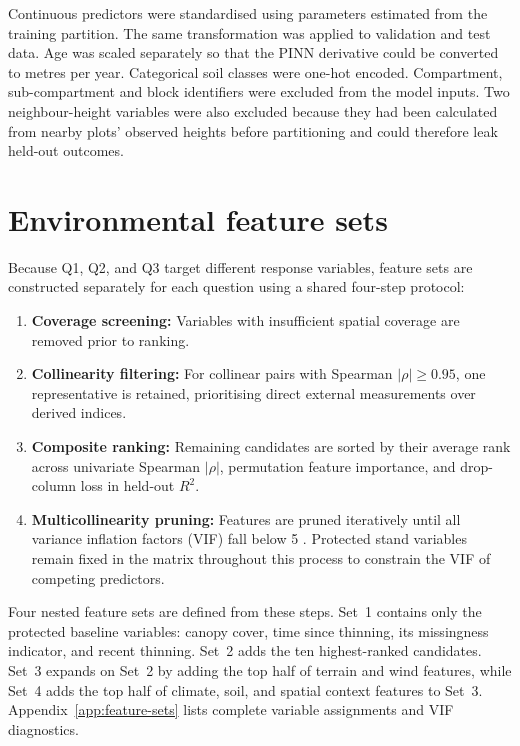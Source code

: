\documentclass[logo,msc,ai]{infthesis}           %
\begin{document}
Continuous predictors were standardised using parameters estimated from the training partition. The same transformation was applied to validation and test data. Age was scaled separately so that the PINN derivative could be converted to metres per year. Categorical soil classes were one-hot encoded. Compartment, sub-compartment and block identifiers were excluded from the model inputs. Two neighbour-height variables were also excluded because they had been calculated from nearby plots' observed heights before partitioning and could therefore leak held-out outcomes.

\section{Environmental feature sets}

Because Q1, Q2, and Q3 target different response variables, feature sets are constructed separately for each question using a shared four-step protocol:

\begin{enumerate}
\setlength\itemsep{0pt}
\item \textbf{Coverage screening:} Variables with insufficient spatial coverage are removed prior to ranking.
\item \textbf{Collinearity filtering:} For collinear pairs with Spearman $|\rho| \ge 0.95$, one representative is retained, prioritising direct external measurements over derived indices.
\item \textbf{Composite ranking:} Remaining candidates are sorted by their average rank across univariate Spearman $|\rho|$, permutation feature importance, and drop-column loss in held-out $R^2$.
\item \textbf{Multicollinearity pruning:} Features are pruned iteratively until all variance inflation factors (VIF) fall below 5 \cite{obrien2007Caution_C5_EVAL}. Protected stand variables remain fixed in the matrix throughout this process to constrain the VIF of competing predictors.
\end{enumerate}

Four nested feature sets are defined from these steps. Set~1 contains only the protected baseline variables: canopy cover, time since thinning, its missingness indicator, and recent thinning. Set~2 adds the ten highest-ranked candidates. Set~3 expands on Set~2 by adding the top half of terrain and wind features, while Set~4 adds the top half of climate, soil, and spatial context features to Set~3. Appendix~\ref{app:feature-sets} lists complete variable assignments and VIF diagnostics.
\end{document}
